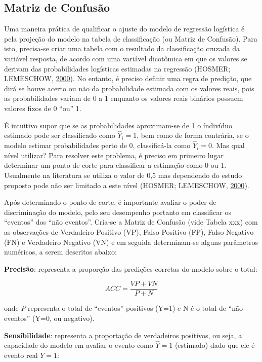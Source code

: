 \documentclass[12pt,brazil,oneside]{book}
\begin{document}
\hypertarget{matriz-de-confusao}{%
\subsection{Matriz de Confusão}\label{matriz-de-confusao}}

Uma maneira prática de qualificar o ajuste do modelo de regressão
logística é pela projeção do modelo na tabela de classificação (ou
Matriz de Confusão). Para isto, precisa-se criar uma tabela com o
resultado da classificação cruzada da variável resposta, de acordo com
uma variável dicotômica em que os valores se derivam das probabilidades
logísticas estimadas na regressão (HOSMER; LEMESCHOW,
\protect\hyperlink{ref-Hosmer2000}{2000}). No entanto, é preciso definir
uma regra de predição, que dirá se houve acerto ou não da probabilidade
estimada com os valores reais, pois as probabilidades variam de 0 a 1
enquanto os valores reais binários possuem valores fixos de 0 ``ou'' 1.

É intuitivo supor que se as probabilidades aproximam-se de 1 o índivíduo
estimado pode ser classificado como \(\hat Y_i=1\), bem como de forma
contrária, se o modelo estimar probabilidades perto de 0, classificá-la
como \(\hat Y_i=0\). Mas qual nível utilizar? Para resolver este
problema, é preciso em primeiro lugar determinar um ponto de corte para
classificar a estimação como 0 ou 1. Usualmente na literatura se utiliza
o valor de 0,5 mas dependendo do estudo proposto pode não ser limitado a
este nível (HOSMER; LEMESCHOW,
\protect\hyperlink{ref-Hosmer2000}{2000}).

Após determinado o ponto de corte, é importante avaliar o poder de
discriminação do modelo, pelo seu desempenho portanto em classificar os
``eventos'' dos ``não eventos''. Cria-se a Matriz de Confusão (vide
Tabela xxx) com as observações de Verdadeiro Positivo (VP), Falso
Positivo (FP), Falso Negativo (FN) e Verdadeiro Negativo (VN) e em
seguida determinam-se alguns parâmetros numéricos, a serem descritos
abaixo:

\textbf{Precisão}: representa a proporção das predições corretas do
modelo sobre o total:

\[
ACC=\frac{VP+VN}{P+N}
\]

onde \(P\) representa o total de ``eventos'' positivos (Y=1) e N é o
total de ``não eventos'' (Y=0, ou negativo).

\textbf{Sensibilidade}: representa a proportação de verdadeiros
positivos, ou seja, a capacidade do modelo em avaliar o evento como
\(\hat Y=1\) (estimado) dado que ele é evento real \(Y=1\):
\end{document}
